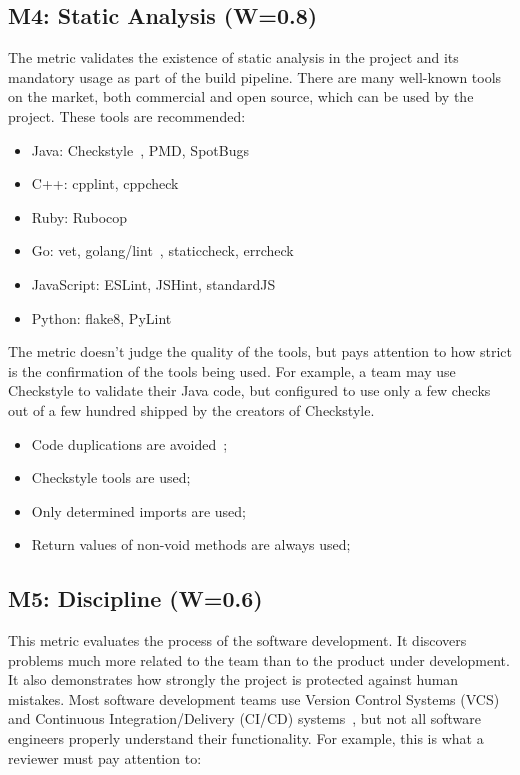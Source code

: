 \documentclass[12pt,oneside]{article}
\begin{document}
\subsection{M4: Static Analysis (W=0.8)}

The metric validates the existence of static analysis in the project
and its mandatory usage as part of the build pipeline.
There are many well-known tools on the market, both commercial and
open source, which can be used by the project. These tools are recommended:

\begin{itemize}
  \item Java: Checkstyle~\citep{checkstyle}, PMD, SpotBugs
  \item C++: cpplint, cppcheck~\citep{li2019cppcheck}
  \item Ruby: Rubocop~\citep{rubocop}
  \item Go: vet, golang/lint~\citep{golint}, staticcheck, errcheck
  \item JavaScript: ESLint, JSHint, standardJS~\citep{kavaler2019tools}
  \item Python: flake8, PyLint~\citep{squamia2019tools}
\end{itemize}

The metric doesn't judge the quality of the tools, but pays attention to how strict is the
confirmation of the tools being used. For example, a team may use Checkstyle
to validate their Java code, but configured to use only a few checks
out of a few hundred shipped by the creators of Checkstyle.

\begin{itemize}
  \item Code duplications are avoided~\citep[pp.39--40]{eo2};
  \item Checkstyle tools are used;
  \item Only determined imports are used;
  \item Return values of non-void methods are always used;
\end{itemize}

\subsection{M5: Discipline (W=0.6)}

This metric evaluates the process of the software
development. It discovers problems much more related to the team than
to the product under development. It also demonstrates how strongly the project is
protected against human mistakes. Most software development teams use
Version Control Systems (VCS)~\citep{spinellis2005vcs, loeliger2012git} and Continuous Integration/Delivery (CI/CD) systems~\citep{mf-ci, miller2008ci}, but not all software engineers properly understand their functionality. For example, this is what
a reviewer must pay attention to:
\end{document}
